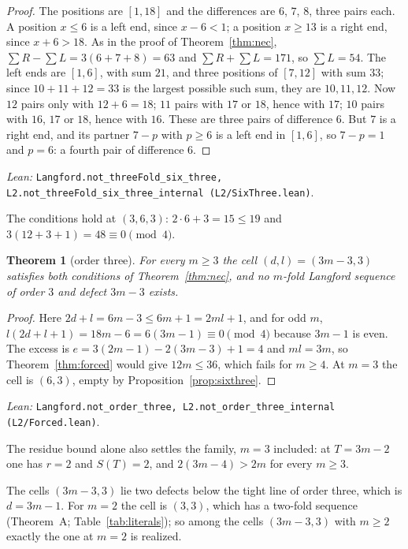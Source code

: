 \documentclass[11pt]{amsart}
\theoremstyle{plain}
\newtheorem{theorem}{Theorem}[section]
\theoremstyle{definition}
\theoremstyle{remark}
\newcommand{\lean}[1]{\par\smallskip
  {\small\raggedright\noindent\textit{Lean:} \texttt{#1}.\par}\smallskip}
\begin{document}
\begin{proof}
The positions are $[1,18]$ and the differences are $6$, $7$, $8$, three pairs each.
A position $x \le 6$ is a left end, since $x - 6 < 1$; a position $x \ge 13$ is a right
end, since $x + 6 > 18$. As in the proof of Theorem~\ref{thm:nec},
$\sum R - \sum L = 3(6+7+8) = 63$ and $\sum R + \sum L = 171$, so $\sum L = 54$. The
left ends are $[1,6]$, with sum $21$, and three positions of $[7,12]$ with sum $33$;
since $10+11+12 = 33$ is the largest possible such sum, they are $10, 11, 12$. Now $12$
pairs only with $12 + 6 = 18$; $11$ pairs with $17$ or $18$, hence with $17$; $10$ pairs
with $16$, $17$ or $18$, hence with $16$. These are three pairs of difference $6$. But
$7$ is a right end, and its partner $7 - p$ with $p \ge 6$ is a left end in $[1,6]$, so
$7 - p = 1$ and $p = 6$: a fourth pair of difference $6$.
\end{proof}
\lean{Langford.not\_threeFold\_six\_three, L2.not\_threeFold\_six\_three\_internal
(L2/SixThree.lean)}

The conditions hold at $(3,6,3)$: $2 \cdot 6 + 3 = 15 \le 19$ and
$3(12+3+1) = 48 \equiv 0 \pmod 4$.

\begin{theorem}[order three]\label{thm:orderthree}
For every $m \ge 3$ the cell $(d,l) = (3m-3,3)$ satisfies both conditions of
Theorem~\ref{thm:nec}, and no $m$-fold Langford sequence of order $3$ and defect $3m-3$
exists.
\end{theorem}

\begin{proof}
Here $2d + l = 6m - 3 \le 6m + 1 = 2ml + 1$, and for odd $m$,
$l(2d+l+1) = 18m - 6 = 6(3m-1) \equiv 0 \pmod 4$ because $3m - 1$ is even. The excess is
$e = 3(2m-1) - 2(3m-3) + 1 = 4$ and $ml = 3m$, so Theorem~\ref{thm:forced} would give
$12m \le 36$, which fails for $m \ge 4$. At $m = 3$ the cell is $(6,3)$, empty by
Proposition~\ref{prop:sixthree}.
\end{proof}
\lean{Langford.not\_order\_three, L2.not\_order\_three\_internal (L2/Forced.lean)}

The residue bound alone also settles the family, $m = 3$ included: at $T = 3m-2$ one has
$r = 2$ and $S(T) = 2$, and $2(3m-4) > 2m$ for every $m \ge 3$.

The cells $(3m-3,3)$ lie two defects below the tight line of order three, which is
$d = 3m - 1$. For $m = 2$ the cell is $(3,3)$, which has a two-fold sequence (Theorem~A;
Table~\ref{tab:literals}); so among the cells $(3m-3,3)$ with $m \ge 2$ exactly the one
at $m = 2$ is realized.
\end{document}

